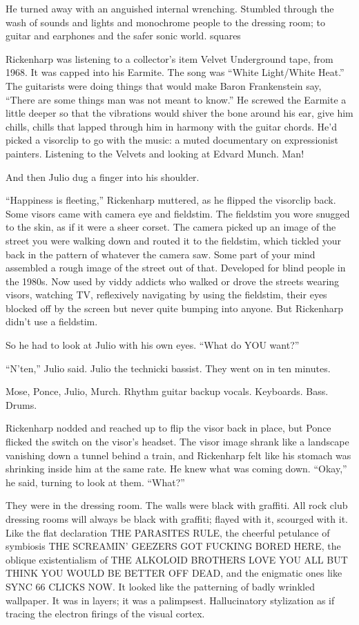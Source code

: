 He turned away with an anguished internal wrenching. Stumbled through the wash of sounds and lights and monochrome people to the dressing room; to guitar and earphones and the safer sonic world.
squares

Rickenharp was listening to a collector’s item Velvet Underground tape, from 1968. It was capped into his Earmite. The song was “White Light/White Heat.” The guitarists were doing things that would make Baron Frankenstein say, “There are some things man was not meant to know.” He screwed the Earmite a little deeper so that the vibrations would shiver the bone around his ear, give him chills, chills that lapped through him in harmony with the guitar chords. He’d picked a visorclip to go with the music: a muted documentary on expressionist painters. Listening to the Velvets and looking at Edvard Munch. Man!

And then Julio dug a finger into his shoulder.

“Happiness is fleeting,” Rickenharp muttered, as he flipped the visorclip back. Some visors came with camera eye and fieldstim. The fieldstim you wore snugged to the skin, as if it were a sheer corset. The camera picked up an image of the street you were walking down and routed it to the fieldstim, which tickled your back in the pattern of whatever the camera saw. Some part of your mind assembled a rough image of the street out of that. Developed for blind people in the 1980s. Now used by viddy addicts who walked or drove the streets wearing visors, watching TV, reflexively navigating by using the fieldstim, their eyes blocked off by the screen but never quite bumping into anyone. But Rickenharp didn’t use a fieldstim.

So he had to look at Julio with his own eyes. “What do YOU want?”

“N’ten,” Julio said. Julio the technicki bassist. They went on in ten minutes.

Mose, Ponce, Julio, Murch. Rhythm guitar backup vocals. Keyboards. Bass. Drums.

Rickenharp nodded and reached up to flip the visor back in place, but Ponce flicked the switch on the visor’s headset. The visor image shrank like a landscape vanishing down a tunnel behind a train, and Rickenharp felt like his stomach was shrinking inside him at the same rate. He knew what was coming down. “Okay,” he said, turning to look at them. “What?”

They were in the dressing room. The walls were black with graffiti. All rock club dressing rooms will always be black with graffiti; flayed with it, scourged with it. Like the flat declaration THE PARASITES RULE, the cheerful petulance of symbiosis THE SCREAMIN’ GEEZERS GOT FUCKING BORED HERE, the oblique existentialism of THE ALKOLOID BROTHERS LOVE YOU ALL BUT THINK YOU WOULD BE BETTER OFF DEAD, and the enigmatic ones like SYNC 66 CLICKS NOW. It looked like the patterning of badly wrinkled wallpaper. It was in layers; it was a palimpsest. Hallucinatory stylization as if tracing the electron firings of the visual cortex.

